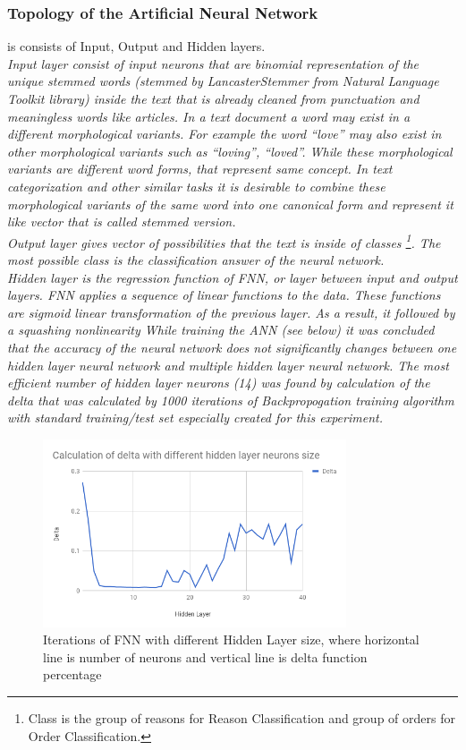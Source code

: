 \documentclass{llncs}
\begin{document}
    \subsubsection{Topology of the Artificial Neural Network} is consists of Input, Output and Hidden layers.\\
    \em Input layer \em consist of input neurons that are binomial representation of the unique stemmed words (stemmed by LancasterStemmer from Natural Language Toolkit library) inside the text that is already cleaned from punctuation and meaningless words like articles.
    In a text document a word may exist in a different morphological variants.
    For example the word “love” may also exist in other morphological variants such as “loving”, “loved”.
    While these morphological variants are different word forms, that represent same concept.
    In text categorization and other similar tasks it is desirable to combine these morphological variants of the same word into one canonical form and represent it like vector that is called stemmed version.\\
    \em Output layer \em gives vector of possibilities that the text is inside of classes \footnote{Class is the group of reasons for Reason Classification and group of orders for Order Classification.}.
    The most possible class is the classification answer of the neural network.\\
    \em Hidden layer \em is the regression function of FNN, or layer between input and output layers.
    FNN applies a sequence of linear functions to the data.
    These functions are sigmoid linear transformation of the previous layer.
    As a result, it followed by a squashing nonlinearity
    While training the ANN (see below) it was concluded that the accuracy of the neural network does not significantly changes between one hidden layer neural network and multiple hidden layer neural network.
    The most efficient number of hidden layer neurons (14) was found by calculation of the delta that was calculated by 1000 iterations of Backpropogation training algorithm with standard training/test set especially created for this experiment.
    \begin{figure}
        \includegraphics[width=0.8\textwidth]{HL.png}
        \caption[]{Iterations of FNN with different Hidden Layer size, where horizontal line is number of neurons and vertical line is delta function percentage}
    \end{figure}
\end{document}
